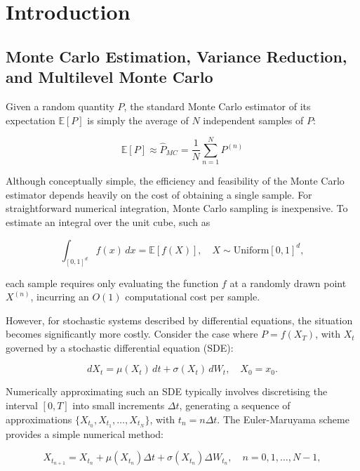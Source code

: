\section{Introduction}\label{sec:introduction}

\subsection{Monte Carlo Estimation, Variance Reduction, and Multilevel Monte Carlo}
Given a random quantity $P$, the standard Monte Carlo estimator of its expectation
$\mathbb{E}[P]$ is simply the average of $N$ independent samples of 
$P$:

\begin{equation*}
    \mathbb{E}[P] \approx \hat{P}_{MC} = \frac{1}{N} \sum_{n=1}^N P^{(n)}
\end{equation*}

Although conceptually simple, the efficiency and feasibility of the Monte Carlo estimator 
depends heavily on the cost of obtaining a single sample. For straightforward 
numerical integration, 
Monte Carlo sampling is inexpensive. To estimate an integral over the unit cube, such as

\begin{equation*}
    \int_{[0,1]^d} f(x)\,dx = \mathbb{E}[f(X)], \quad X\sim\text{Uniform}[0,1]^d,
\end{equation*}

each sample requires only evaluating the function $f$ at a randomly drawn point $X^{(n)}$, 
incurring an $O(1)$ computational cost per sample. 

However, for stochastic systems described by differential equations, the situation becomes 
significantly more costly. Consider the case where $P=f(X_T)$, with $X_t$ governed by 
a stochastic differential equation (SDE):

\begin{equation*}
    dX_t=\mu(X_t)\,dt+\sigma(X_t)\,dW_t,\quad X_0=x_0.
\end{equation*}

Numerically approximating such an SDE typically involves discretising the interval $[0,T]$ into 
small increments $\Delta t$, generating a sequence of approximations 
$\{X_{t_0}, X_{t_1}, \dots, X_{t_N}\}$, with $t_n=n \Delta t$. The 
Euler-Maruyama scheme provides a simple numerical method:

\begin{equation}\label{eq:euler_maruyama}
    X_{t_{n+1}}=X_{t_n}+\mu(X_{t_n})\Delta t+\sigma(X_{t_n})\Delta W_{t_n},\quad n=0,1,\dots,N-1,
\end{equation}

